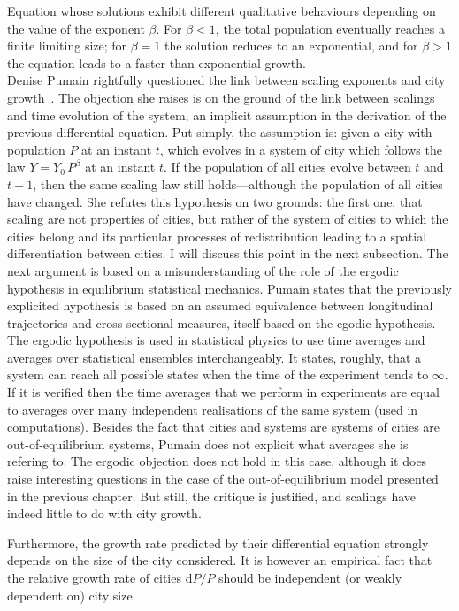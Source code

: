 Equation whose solutions exhibit different qualitative behaviours depending on
the value of the exponent $\beta$. For $\beta < 1$, the total population
eventually reaches a finite limiting size; for $\beta = 1$ the solution reduces
to an exponential, and for $\beta > 1$ the equation leads to a
faster-than-exponential growth.\\
Denise Pumain rightfully questioned the link between scaling exponents and city
growth~\cite{Pumain:2012}. The objection she raises is on the ground of the link
between scalings and time evolution of the system, an implicit assumption in the
derivation of the previous differential equation. Put simply, the assumption is:
given a city with population $P$ at an instant $t$, which evolves in a system of
city which follows the law $Y = Y_0\,P^\beta$ at an instant $t$. If the
population of all cities evolve between $t$ and $t+1$, then the same scaling law
still holds---although the population of all cities have changed. She refutes
this hypothesis on two grounds: the first one, that scaling are not properties
of cities, but rather of the system of cities to which the cities belong and its
particular processes of redistribution leading to a spatial differentiation
between cities.  I will discuss this point in the next subsection. The next
argument is based on a misunderstanding of the role of the ergodic hypothesis in
equilibrium statistical mechanics. Pumain states that the previously explicited
hypothesis is based on an assumed equivalence between longitudinal trajectories and
cross-sectional measures, itself based on the egodic hypothesis. The ergodic
hypothesis is used in statistical physics to use time averages and averages over
statistical ensembles interchangeably. It states, roughly, that a system can
reach all possible states when the time of the experiment tends to $\infty$. If
it is verified then the time averages that we perform in experiments are equal
to averages over many independent realisations of the same system (used in
computations). Besides the fact that cities and systems are systems of cities
are out-of-equilibrium systems, Pumain does not explicit what averages she is
refering to. The ergodic objection does not hold in this case, although it does
raise interesting questions in the case of the out-of-equilibrium model
presented in the previous chapter. But still, the critique is justified, and
scalings have indeed little to do with city growth.

Furthermore, the growth rate predicted by their differential equation strongly
depends on the size of the city considered. It is however an empirical fact that
the relative growth rate of cities $\mathrm{d}P / P$ should be independent (or
weakly dependent on) city size.


